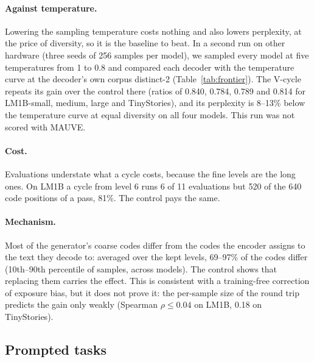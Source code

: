 \documentclass[11pt]{article}
\begin{document}
\paragraph{Against temperature.} Lowering the sampling temperature costs nothing and also lowers perplexity, at the
price of diversity, so it is the baseline to beat. In a second run on other hardware (three seeds of 256 samples per
model), we sampled every model at five temperatures from 1 to 0.8 and compared each decoder with the temperature curve
at the decoder's own corpus distinct-2 (Table~\ref{tab:frontier}). The V-cycle repeats its gain over the control there
(ratios of 0.840, 0.784, 0.789 and 0.814 for LM1B-small, medium, large and TinyStories), and its perplexity is 8--13\%
below the temperature curve at equal diversity on all four models. This run was not scored with MAUVE.

\paragraph{Cost.} Evaluations understate what a cycle costs, because the fine levels are the long ones. On LM1B a cycle
from level 6 runs 6 of 11 evaluations but 520 of the 640 code positions of a pass, 81\%. The control pays the same.

\paragraph{Mechanism.} Most of the generator's coarse codes differ from the codes the encoder assigns to the text they
decode to: averaged over the kept levels, 69--97\% of the codes differ (10th--90th percentile of samples, across
models). The control shows that replacing them carries the effect. This is consistent with a training-free correction of exposure bias, but
it does not prove it: the per-sample size of the round trip predicts the gain only weakly (Spearman $\rho\le0.04$ on
LM1B, 0.18 on TinyStories).

\subsection{Prompted tasks}
\end{document}
